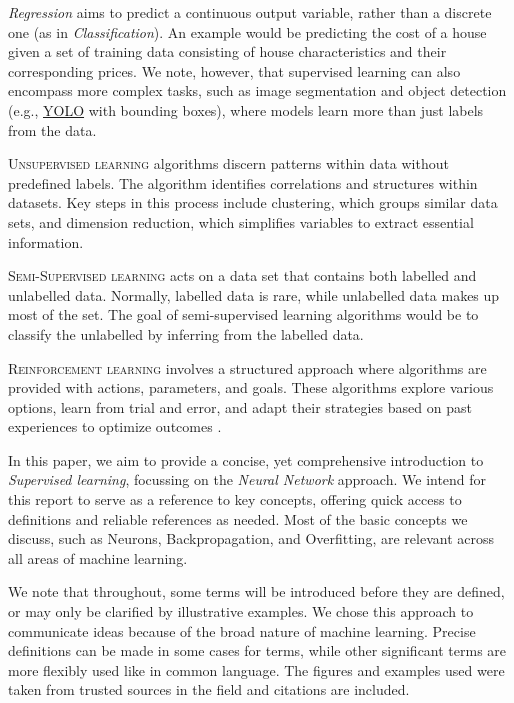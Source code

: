 \documentclass{article}
\begin{document}
  \textit{Regression} aims to predict a continuous output variable, rather than a discrete one (as in \textit{Classification}). An example would be predicting the cost of a house given a set of training data consisting of house characteristics and their corresponding prices. We note, however, that supervised learning can also encompass more complex tasks, such as image segmentation and object detection (e.g., \href{https://github.com/ultralytics/ultralytics}{YOLO} with bounding boxes), where models learn more than just labels from the data.

\vspace{4mm}
\noindent\textsc{Unsupervised learning} algorithms discern patterns within data without predefined labels. The algorithm identifies correlations and structures within datasets. Key steps in this process include clustering, which groups similar data sets, and dimension reduction, which simplifies variables to extract essential information. 

\vspace{4mm}
\noindent\textsc{Semi-Supervised learning} acts on a data set that contains both labelled and unlabelled data. Normally, labelled data is rare, while unlabelled data makes up most of the set. The goal of semi-supervised learning algorithms would be to classify the unlabelled by inferring from the labelled data.

\vspace{4mm}
\noindent\textsc{Reinforcement learning} involves a structured approach where algorithms are provided with actions, parameters, and goals. These algorithms explore various options, learn from trial and error, and adapt their strategies based on past experiences to optimize outcomes \citep{GuideML}.

In this paper, we aim to provide a concise, yet comprehensive introduction to \textit{Supervised learning}, focussing on the \textit{Neural Network} approach. We intend for this report to serve as a reference to key concepts, offering quick access to definitions and reliable references as needed. Most of the basic concepts we discuss, such as Neurons, Backpropagation, and Overfitting, are relevant across all areas of machine learning.

We note that throughout, some terms will be introduced before they are defined, or may only be clarified by illustrative examples. We chose this approach to communicate ideas because of the broad nature of machine learning. Precise definitions can be made in some cases for terms, while other significant terms are more flexibly used like in common language. The figures and examples used were taken from trusted sources in the field and citations are included. 
\end{document}

